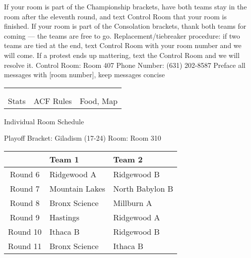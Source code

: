 \documentclass{article}%
\begin{document}
\vspace*{16pt}%
\linebreak%
If your room is part of the Championship brackets, have both teams stay in the room after the eleventh round, and text Control Room that your room is finished.\newline%
\newline%
If your room is part of the Consolation brackets, thank both teams for coming — the teams are free to go.\newline%
\newline%
Replacement/tiebreaker procedure: if two teams are tied at the end, text Control Room with your room number and we will come. If a protest ends up mattering, text the Control Room and we will resolve it.\newline%
\newline%
Control Room: Room 407\newline%
Phone Number: (631) 202{-}8587\newline%
Preface all messages with {[}room number{]}, keep messages concise%
\vspace*{30pt}%
\newline%
%
\begin{tabularx}{\textwidth}{YYY}%
  &  &  \\%
\\%
Stats&ACF Rules&Food, Map\\%
\end{tabularx}%
\newpage%
\begin{center}%
\begin{Huge}%
Individual Room Schedule%
\end{Huge}%
\vspace*{16pt}%
\linebreak%
\begin{Large}%
Playoff Bracket: Giladism (17-24) \hfill Room: Room 310%
\end{Large}%
\end{center}%
%
\begin{tabularx}{\textwidth}{|c|Y|Y|}%
\hline%
&Team 1&Team 2\\%
\hline%
Round 6&Ridgewood A&Ridgewood B\\%
Round 7&Mountain Lakes&North Babylon B\\%
Round 8&Bronx Science&Millburn A\\%
Round 9&Hastings&Ridgewood A\\%
Round 10&Ithaca B&Ridgewood B\\%
Round 11&Bronx Science&Ithaca B\\%
\hline%
\end{tabularx}%
\end{document}
